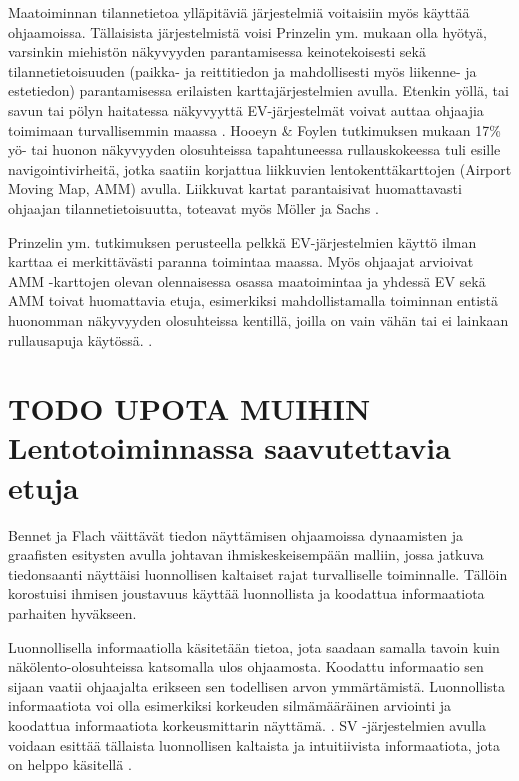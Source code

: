 \documentclass[utf8,bachelor,manualbib]{gradu3}
\begin{document}
Maatoiminnan tilannetietoa ylläpitäviä järjestelmiä voitaisiin myös käyttää ohjaamoissa. Tällaisista järjestelmistä voisi Prinzelin ym. \citeyearpar{prinzel2013} mukaan olla hyötyä, varsinkin miehistön näkyvyyden parantamisessa keinotekoisesti sekä tilannetietoisuuden (paikka- ja reittitiedon ja mahdollisesti myös liikenne- ja estetiedon) parantamisessa erilaisten karttajärjestelmien avulla. Etenkin yöllä, tai savun tai pölyn haitatessa näkyvyyttä EV-järjestelmät voivat auttaa ohjaajia toimimaan turvallisemmin maassa \citep{prinzel2013}. Hooeyn \& Foylen \citeyearpar{hooey2007} tutkimuksen mukaan 17\% yö- tai huonon näkyvyyden olosuhteissa tapahtuneessa rullauskokeessa tuli esille navigointivirheitä, jotka saatiin korjattua liikkuvien lentokenttäkarttojen (Airport Moving Map, AMM) avulla. Liikkuvat kartat parantaisivat huomattavasti ohjaajan tilannetietoisuutta, toteavat myös Möller ja Sachs \citeyearpar{mollersachs1994}.

Prinzelin ym. \citeyearpar{prinzel2013} tutkimuksen perusteella pelkkä EV-järjestelmien käyttö ilman karttaa ei merkittävästi paranna toimintaa maassa. Myös ohjaajat arvioivat AMM -karttojen olevan olennaisessa osassa maatoimintaa ja yhdessä EV sekä AMM toivat huomattavia etuja, esimerkiksi mahdollistamalla toiminnan entistä huonomman näkyvyyden olosuhteissa kentillä, joilla on vain vähän tai ei lainkaan rullausapuja käytössä. \citep{prinzel2013}.

\section{TODO UPOTA MUIHIN Lentotoiminnassa saavutettavia etuja}

Bennet ja Flach \citeyearpar{bennetflach1994} väittävät tiedon näyttämisen ohjaamoissa dynaamisten ja graafisten esitysten avulla johtavan ihmiskeskeisempään malliin, jossa jatkuva tiedonsaanti näyttäisi luonnollisen kaltaiset rajat turvalliselle toiminnalle. Tällöin korostuisi ihmisen joustavuus käyttää luonnollista ja koodattua informaatiota parhaiten hyväkseen.

Luonnollisella informaatiolla käsitetään tietoa, jota saadaan samalla tavoin kuin näkölento-olosuhteissa katsomalla ulos ohjaamosta. Koodattu informaatio sen sijaan vaatii ohjaajalta erikseen sen todellisen arvon ymmärtämistä. Luonnollista informaatiota voi olla esimerkiksi korkeuden silmämääräinen arviointi ja koodattua informaatiota korkeusmittarin näyttämä. \citep{prinzel2004}. SV -järjestelmien avulla voidaan esittää tällaista luonnollisen kaltaista ja intuitiivista informaatiota, jota on helppo käsitellä \citep{wickensandre1990}.
\end{document}
